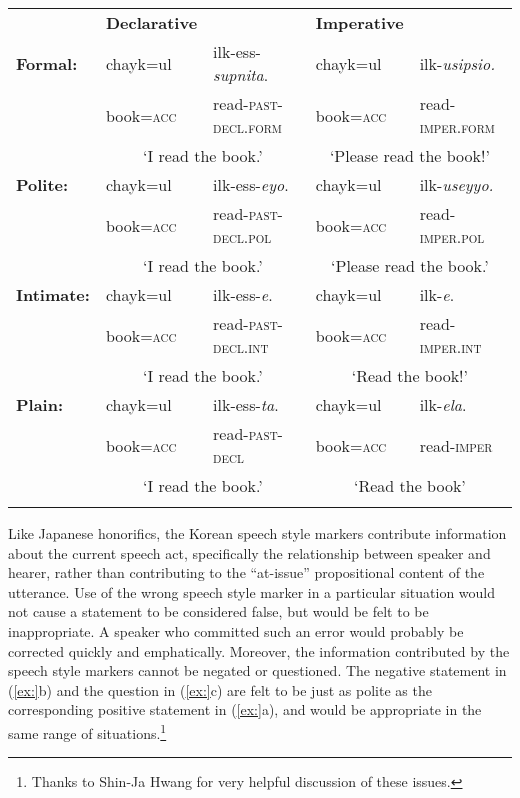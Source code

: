 \begin{tabularx}{\textwidth}{XXXXX}
\lsptoprule
\hhline{~----} & \bfseries Declarative &  & \bfseries Imperative & \\
\hhline{~----}
\bfseries Formal: & chayk=ul & ilk-ess-\textit{supnita}. & chayk=ul & ilk-\textit{usipsio.}\\
& book=\textsc{acc} & read-\textsc{past-decl.form} & book=\textsc{acc} & read-\textsc{imper.form}\\
& \multicolumn{2}{c}{‘I read the book.’} & \multicolumn{2}{c}{‘Please read the book!’}\\
\hhline{~----}
\bfseries Polite: & chayk=ul & ilk-ess-\textit{eyo}. & chayk=ul & ilk-\textit{useyyo.}\\
& book=\textsc{acc} & read-\textsc{past-decl.pol} & book=\textsc{acc} & read-\textsc{imper.pol}\\
& \multicolumn{2}{c}{‘I read the book.’} & \multicolumn{2}{c}{‘Please read the book.’}\\
\hhline{~----}
\bfseries Intimate: & chayk=ul & ilk-ess-\textit{e}. & chayk=ul & ilk-\textit{e}.\\
& book=\textsc{acc} & read-\textsc{past-decl.int} & book=\textsc{acc} & read-\textsc{imper.int}\\
& \multicolumn{2}{c}{‘I read the book.’} & \multicolumn{2}{c}{‘Read the book!’}\\
\hhline{~----}
\bfseries Plain: & chayk=ul & ilk-ess-\textit{ta}. & chayk=ul & ilk-\textit{ela}.\\
& book=\textsc{acc} & read-\textsc{past-decl} & book=\textsc{acc} & read-\textsc{imper}\\
& \multicolumn{2}{c}{‘I read the book.’} & \multicolumn{2}{c}{‘Read the book’}\\
\hhline{~----}
\lspbottomrule
\end{tabularx}

Like Japanese honorifics, the Korean speech style markers contribute information about the current speech act, specifically the relationship between speaker and hearer, rather than contributing to the “at-issue” propositional content of the utterance. Use of the wrong speech style marker in a particular situation would not cause a statement to be considered false, but would be felt to be inappropriate. A speaker who committed such an error would probably be corrected quickly and emphatically. Moreover, the information contributed by the speech style markers cannot be negated or questioned. The negative statement in (\ref{ex:}b) and the question in (\ref{ex:}c) are felt to be just as polite as the corresponding positive statement in (\ref{ex:}a), and would be appropriate in the same range of situations.\footnote{Thanks to Shin-Ja Hwang for very helpful discussion of these issues.}


